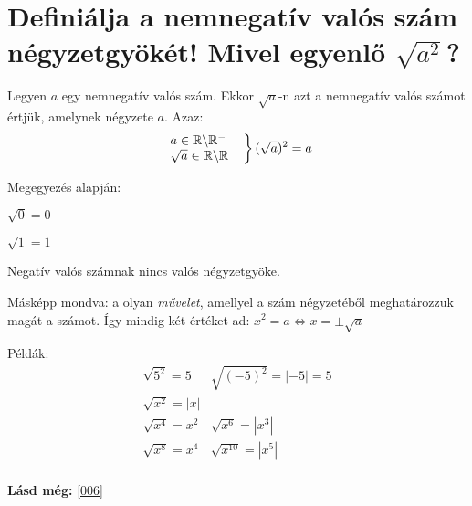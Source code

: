 
\section{Definiálja a nemnegatív valós szám négyzetgyökét! Mivel egyenlő 
\texorpdfstring{$\sqrt{a^2}$}{sqrt(a**2)}?}
\label{008}

\begin{defin}[Négyzetgyök]
Legyen $a$ egy nemnegatív valós szám. Ekkor $\sqrt{a}$-n azt a nemnegatív valós
számot értjük, amelynek négyzete $a$. Azaz:
\[
\left.
\begin{array}{l}
  a \in \mathbb{R} \backslash \mathbb{R}^-\\
  \sqrt{a} \in \mathbb{R} \backslash \mathbb{R}^-
\end{array}
\right\} 
(\sqrt{a})^2 = a
\]

Megegyezés alapján:

$\sqrt{0} = 0$

$\sqrt{1} = 1$

Negatív valós számnak nincs valós négyzetgyöke.

Másképp mondva: a  olyan \emph{művelet}, amellyel a
szám négyzetéből meghatározzuk magát a számot. Így mindig két értéket ad:
$x^2 = a \Leftrightarrow x = \pm \sqrt{a}$
\end{defin}

Példák:
\[
\begin{array}{l|r}
  \sqrt{5^2} = 5   & \sqrt{(-5)^2} = |-5| = 5\\\hline
  \sqrt{x^2} = |x| & \\\hline
  \sqrt{x^4} = x^2 & \sqrt{x^6} = |x^3|\\\hline
  \sqrt{x^8} = x^4 & \sqrt{x^{10}} = |x^5|\\
\end{array}
\]

\textbf{Lásd még:} \ref{006}
